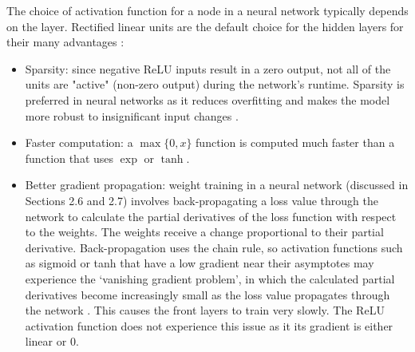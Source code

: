\documentclass[honours,12pt]{unswthesis}
\numberwithin{equation}{section}
\theoremstyle{definition}
\begin{document}
The choice of activation function for a node in a neural network typically depends on the layer. Rectified linear units are the default choice for the hidden layers for their many advantages \citep{DeepLearning}:
\begin{itemize}
\item Sparsity: since negative ReLU inputs result in a zero output, not all of the units are "active" (non-zero output) during the network's runtime. Sparsity is preferred in neural networks as it reduces overfitting and makes the model more robust to insignificant input changes \citep{sparse}.
\item Faster computation: a $\max\{0,x\}$ function is computed much faster than a function that uses $\exp$ or $\tanh$.
\item Better gradient propagation: weight training in a neural network (discussed in Sections 2.6 and 2.7) involves back-propagating a loss value through the network to calculate the partial derivatives of the loss function with respect to the weights. The weights receive a change proportional to their partial derivative. Back-propagation uses the chain rule, so activation functions such as sigmoid or tanh that have a low gradient near their asymptotes may experience the `vanishing gradient problem', in which the calculated partial derivatives become increasingly small as the loss value propagates through the network \citep{kolen}. This causes the front layers to train very slowly. The ReLU activation function does not experience this issue as it its gradient is either linear or $0$.
\end{itemize}
\end{document}
